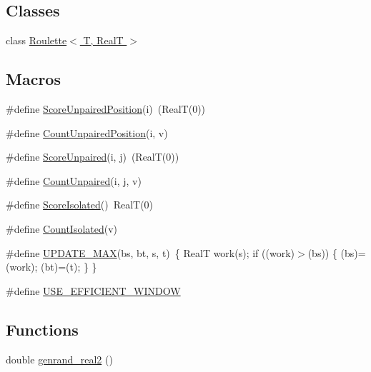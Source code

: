 \subsection*{Classes}
\begin{DoxyCompactItemize}
\item 
class \hyperlink{class_roulette}{Roulette$<$ T, Real\+T $>$}
\end{DoxyCompactItemize}
\subsection*{Macros}
\begin{DoxyCompactItemize}
\item 
\#define \hyperlink{centroidalifold_2contrafold_2_inference_engine_8ipp_a666eda33d91985654878e47d2ae946f9}{Score\+Unpaired\+Position}(i)~(Real\+T(0))
\item 
\#define \hyperlink{centroidalifold_2contrafold_2_inference_engine_8ipp_ad1a5e921b0e92db551f427174caf4a17}{Count\+Unpaired\+Position}(i, v)
\item 
\#define \hyperlink{centroidalifold_2contrafold_2_inference_engine_8ipp_a60bcc697793ce883a656595cf9732373}{Score\+Unpaired}(i, j)~(Real\+T(0))
\item 
\#define \hyperlink{centroidalifold_2contrafold_2_inference_engine_8ipp_a1056d51ce4855d6c744d64cb4414889e}{Count\+Unpaired}(i, j, v)
\item 
\#define \hyperlink{centroidalifold_2contrafold_2_inference_engine_8ipp_ac7f880303691dec46142c5aa8ea7a874}{Score\+Isolated}()~Real\+T(0)
\item 
\#define \hyperlink{centroidalifold_2contrafold_2_inference_engine_8ipp_ac58980ba92ea9f88ce315d81b41b4788}{Count\+Isolated}(v)
\item 
\#define \hyperlink{centroidalifold_2contrafold_2_inference_engine_8ipp_aa442846731fffbfb508207db22742336}{U\+P\+D\+A\+T\+E\+\_\+\+M\+A\+X}(bs, bt, s, t)~\{ Real\+T work(s); if ((work)$>$(bs)) \{ (bs)=(work); (bt)=(t); \} \}
\item 
\#define \hyperlink{centroidalifold_2contrafold_2_inference_engine_8ipp_a7e408bb5a1389bf6eeded11b1b863d5d}{U\+S\+E\+\_\+\+E\+F\+F\+I\+C\+I\+E\+N\+T\+\_\+\+W\+I\+N\+D\+O\+W}
\end{DoxyCompactItemize}
\subsection*{Functions}
\begin{DoxyCompactItemize}
\item 
double \hyperlink{centroidalifold_2contrafold_2_inference_engine_8ipp_aba62640e476eb86ecd383e1519e9b310}{genrand\+\_\+real2} ()
\end{DoxyCompactItemize}



